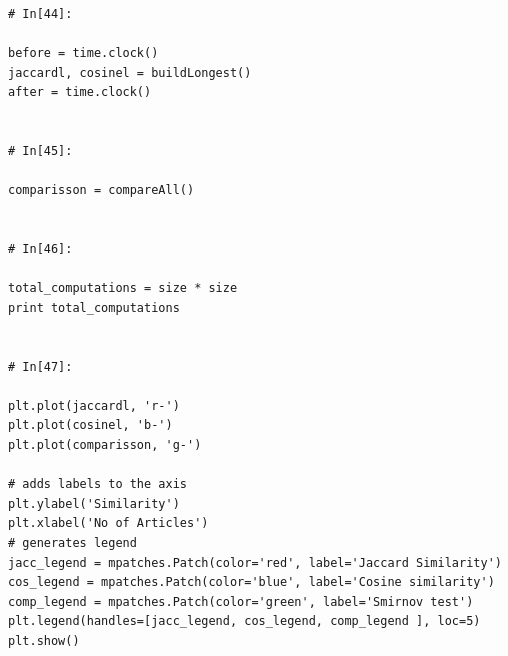 \documentclass{WeSTassignment}
\begin{document}
\begin{lstlisting}
# In[44]:

before = time.clock()
jaccardl, cosinel = buildLongest()
after = time.clock()


# In[45]:

comparisson = compareAll()


# In[46]:

total_computations = size * size
print total_computations


# In[47]:

plt.plot(jaccardl, 'r-')
plt.plot(cosinel, 'b-')
plt.plot(comparisson, 'g-')

# adds labels to the axis
plt.ylabel('Similarity')
plt.xlabel('No of Articles')
# generates legend
jacc_legend = mpatches.Patch(color='red', label='Jaccard Similarity')
cos_legend = mpatches.Patch(color='blue', label='Cosine similarity')
comp_legend = mpatches.Patch(color='green', label='Smirnov test')
plt.legend(handles=[jacc_legend, cos_legend, comp_legend ], loc=5)
plt.show()


\end{lstlisting}
\end{document}
